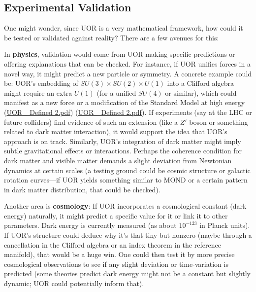 \documentclass[12pt]{article}
\begin{document}
\subsection{Experimental Validation}

One might wonder, since UOR is a very mathematical framework, how could it be tested or validated against reality? There are a few avenues for this:

\medskip

In \textbf{physics}, validation would come from UOR making specific predictions or offering explanations that can be checked. For instance, if UOR unifies forces in a novel way, it might predict a new particle or symmetry. A concrete example could be: UOR’s embedding of $SU(3)\times SU(2)\times U(1)$ into a Clifford algebra might require an extra $U(1)$ (for a unified $SU(4)$ or similar), which could manifest as a new force or a modification of the Standard Model at high energy (\href{file://file-TBF3nHDaRR5QeVMmwCFYkp#:~:text=which%20in%20turn%20contains%20subgroups,Within%20UOR%2C%20one%20could%20let}{UOR\_ Defined 2.pdf}) (\href{file://file-TBF3nHDaRR5QeVMmwCFYkp#:~:text=Cosmo%20Const%20Proof%20Supp1,Such%20an%20approach%20aligns%20with}{UOR\_ Defined 2.pdf}). If experiments (say at the LHC or future colliders) find evidence of such an extension (like a $Z'$ boson or something related to dark matter interaction), it would support the idea that UOR’s approach is on track. Similarly, UOR’s integration of dark matter might imply subtle gravitational effects or interactions. Perhaps the coherence condition for dark matter and visible matter demands a slight deviation from Newtonian dynamics at certain scales (a testing ground could be cosmic structure or galactic rotation curves---if UOR yields something similar to MOND or a certain pattern in dark matter distribution, that could be checked).

\medskip

Another area is \textbf{cosmology}: If UOR incorporates a cosmological constant (dark energy) naturally, it might predict a specific value for it or link it to other parameters. Dark energy is currently measured (as about $10^{-123}$ in Planck units). If UOR’s structure could deduce why it’s that tiny but nonzero (maybe through a cancellation in the Clifford algebra or an index theorem in the reference manifold), that would be a huge win. One could then test it by more precise cosmological observations to see if any slight deviation or time-variation is predicted (some theories predict dark energy might not be a constant but slightly dynamic; UOR could potentially inform that).
\end{document}
